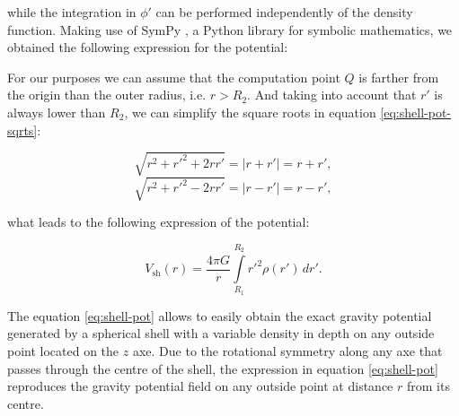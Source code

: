 \documentclass[extra]{gji}
\begin{document}
\noindent while the integration in $\phi'$ can be performed
independently of the density function.
Making use of SymPy \citep{sympy2017}, a Python library for symbolic
mathematics, we obtained the following expression for the potential:


For our purposes we can assume that the computation point $Q$ is
farther from the origin than the outer radius, i.e. $r>R_2$.
And taking into account that $r'$ is always lower than $R_2$, we can
simplify the square roots in equation \ref{eq:shell-pot-sqrts}:

\begin{equation}
    \sqrt{r^2 + r'^2 + 2rr'} = |r + r'| = r + r',
\end{equation}
\begin{equation}
    \sqrt{r^2 + r'^2 - 2rr'} = |r - r'| = r - r',
\end{equation}

\noindent what leads to the following expression of the potential:

\begin{equation}
    V_\text{sh}(r) = \frac{4\pi G}{r}
    \int\limits_{R_1}^{R_2} {r'}^2 \rho(r') \, dr'.
\label{eq:shell-pot}
\end{equation}

The equation \ref{eq:shell-pot} allows to easily obtain the exact
gravity potential generated by a spherical shell with a variable
density in depth on any outside point located on the $z$ axe.
Due to the rotational symmetry along any axe that passes through the
centre of the shell, the expression in equation \ref{eq:shell-pot}
reproduces the gravity potential field on any outside point at distance
$r$ from its centre.
\end{document}
